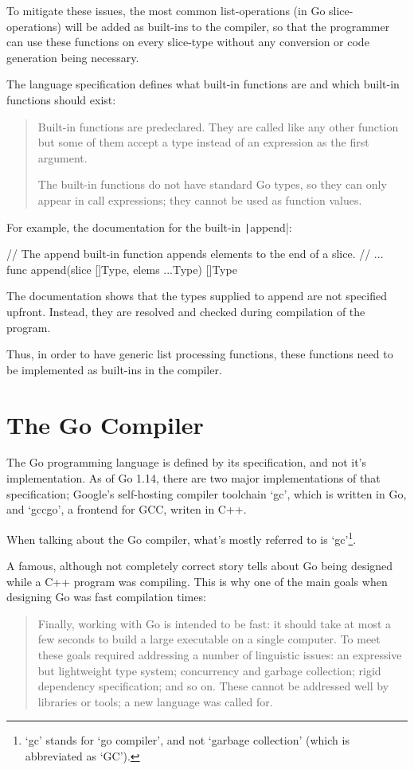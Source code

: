 To mitigate these issues, the most common list-operations (in Go slice-operations) will
be added as built-ins to the compiler, so that the programmer can use these functions
on every slice-type without any conversion or code generation being necessary.

The language specification defines what built-in functions are and which built-in
functions should exist:
\begin{quote}
    Built-in functions are predeclared. They are called like any other function
    but some of them accept a type instead of an expression as the first argument.

    The built-in functions do not have standard Go types, so they can only appear
    in call expressions; they cannot be used as function values.\autocite{go-spec-builtins}
\end{quote}

For example, the documentation for the built-in \texttt|append|:
\begin{gocode}
// The append built-in function appends elements to the end of a slice.
// ...
func append(slice []Type, elems ...Type) []Type
\end{gocode}

The documentation shows that the types supplied to append are not specified upfront.
Instead, they are resolved and checked during compilation of the program.

Thus, in order to have generic list processing functions, these functions need to
be implemented as built-ins in the compiler.

\section{The Go Compiler}

The Go programming language is defined by its specification\autocite{go-spec}, and not
it's implementation. As of Go 1.14, there are two major implementations of that
specification; Google's self-hosting compiler toolchain `gc', which is written in
Go, and `gccgo', a frontend for GCC, writen in C++.

When talking about the Go compiler, what's mostly referred to is `gc'\footnote{`gc' stands
for `go compiler', and not `garbage collection' (which is abbreviated as `GC').}.

A famous, although not completely correct story tells about Go being designed
while a C++ program was compiling\autocite{less-is-more}.
This is why one of the main goals when designing Go was fast compilation times:
\begin{quote}
    Finally, working with Go is intended to be fast: it should take at most a few
    seconds to build a large executable on a single computer. To meet these goals
    required addressing a number of linguistic issues: an expressive but lightweight
    type system; concurrency and garbage collection; rigid dependency specification;
    and so on. These cannot be addressed well by libraries or tools; a new language
    was called for.\autocite{go-faq}
\end{quote}

